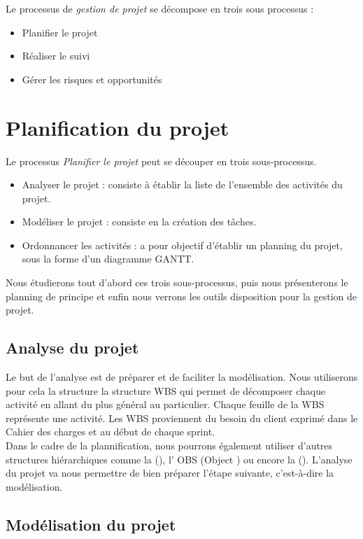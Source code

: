 Le processus de \textit{gestion de projet} se décompose en trois sous processus : 
\begin{itemize}
\item Planifier le projet
\item Réaliser le suivi
\item Gérer les risques et opportunités
\end{itemize}

\section{Planification du projet}
\label{planification}

Le processus \textit{Planifier le projet} peut se découper en trois sous-processus.

\begin{itemize}
\item Analyser le projet : consiste à établir la liste de l'ensemble des activités du projet.
\item Modéliser le projet : consiste en la création des tâches.
\item Ordonnancer les activités : a pour objectif d'établir un planning du projet, sous la forme d'un diagramme GANTT.
\end{itemize}

Nous étudierons tout d'abord ces trois sous-processus, puis nous présenterons le planning de principe et enfin nous verrons les outils  disposition pour la gestion de projet. 

\subsection{Analyse du projet}
\label{analyse}
Le but de l'analyse est de préparer et de faciliter la modélisation. Nous utiliserons pour cela la structure la structure WBS qui permet de décomposer chaque activité en allant du plus général au particulier. Chaque feuille de la WBS représente une activité. Les WBS proviennent du besoin du client exprimé dans le Cahier des charges et au début de chaque sprint. \\

Dans le cadre de la plannification, nous pourrons également utiliser d’autres structures hiérarchiques comme la \FBSCourt (\FBS), l’ OBS (Object \BS) ou encore la \RBSCourt (\RBS). L’analyse du projet va nous permettre de bien préparer l’étape suivante, c’est-à-dire la modélisation.


\subsection{Modélisation du projet}
\label{modelisation}

